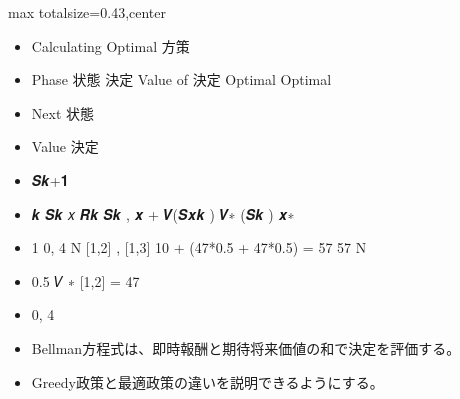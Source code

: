 \clearpage
{}
\begin{minipage}[t]{0.405\textwidth}
\begin{adjustbox}{max totalsize={\textwidth}{0.43\textheight},center}
\begin{minipage}{\textwidth}\scriptsize
{}\begin{itemize}
\item Calculating Optimal 方策
\item Phase 状態 決定 Value of 決定 Optimal Optimal
\item Next 状態
\item Value 決定
\item 𝑺𝒌+𝟏
\item 𝒌 𝑺𝒌 𝑥 𝑹𝒌 𝑺𝒌 , 𝒙 + 𝑽(𝑺𝒙𝒌 ) 𝑽∗ (𝑺𝒌 ) 𝒙∗
\item 1 0, 4 N [1,2] , [1,3] 10 + (47*0.5 + 47*0.5) = 57 57 N
\item 0.5 𝑉 ∗ [1,2] = 47
\item 0, 4
\end{itemize}\begin{itemize}
\item Bellman方程式は、即時報酬と期待将来価値の和で決定を評価する。
\item Greedy政策と最適政策の違いを説明できるようにする。
\end{itemize}
\end{minipage}
\end{adjustbox}
\end{minipage}\hfill
